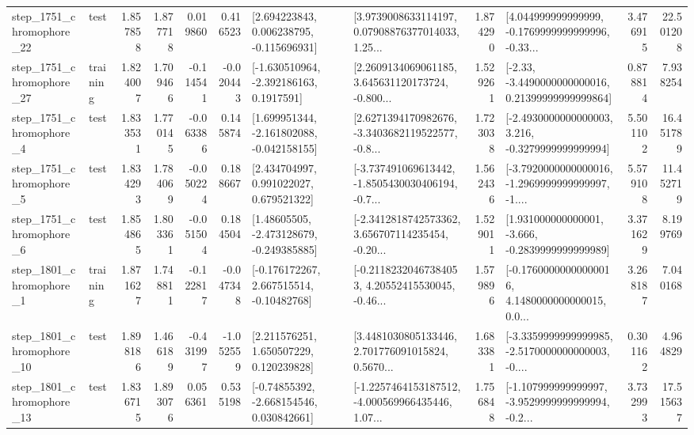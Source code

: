 \begin{tabular}{llrrrrllrlrr}
 step\_1751\_chromophore\_22 &      test &      1.857858 &    1.877718 &      0.019860 &  0.416523 &    [2.694223843, 0.006238795, -0.115696931] &  [3.9739008633114197, 0.07908876377014033, 1.25... &       1.874290 &  [4.044999999999999, -0.1769999999999996, -0.33... &            3.476915 &         22.501208 \\
 step\_1751\_chromophore\_27 &  training &      1.824007 &    1.709466 &     -0.114541 & -0.020443 &     [-1.630510964, -2.392186163, 0.1917591] &  [2.2609134069061185, 3.645631120173724, -0.800... &       1.529261 &  [-2.33, -3.4490000000000016, 0.21399999999999864] &            0.878814 &          7.938254 \\
  step\_1751\_chromophore\_4 &      test &      1.833531 &    1.770145 &     -0.063386 &  0.145874 &   [1.699951344, -2.161802088, -0.042158155] &  [2.6271394170982676, -3.3403682119522577, -0.8... &       1.723038 &  [-2.4930000000000003, 3.216, -0.3279999999999994] &            5.501102 &         16.451789 \\
  step\_1751\_chromophore\_5 &      test &      1.834293 &    1.784069 &     -0.050224 &  0.188667 &     [2.434704997, 0.991022027, 0.679521322] &  [-3.737491069613442, -1.8505430030406194, -0.7... &       1.562436 &  [-3.7920000000000016, -1.2969999999999997, -1.... &            5.579108 &         11.452719 \\
  step\_1751\_chromophore\_6 &      test &      1.854865 &    1.803361 &     -0.051504 &  0.184504 &    [1.48605505, -2.473128679, -0.249385885] &  [-2.3412818742573362, 3.656707114235454, -0.20... &       1.529011 &   [1.931000000000001, -3.666, -0.2839999999999989] &            3.371629 &          8.199769 \\
  step\_1801\_chromophore\_1 &  training &      1.871627 &    1.748811 &     -0.122817 & -0.047348 &    [-0.176172267, 2.667515514, -0.10482768] &  [-0.21182320467384053, 4.20552415530045, -0.46... &       1.579896 &  [-0.17600000000000016, 4.1480000000000015, 0.0... &            3.268187 &          7.040168 \\
 step\_1801\_chromophore\_10 &      test &      1.898186 &    1.466189 &     -0.431997 & -1.052559 &     [2.211576251, 1.650507229, 0.120239828] &  [3.4481030805133446, 2.701776091015824, 0.5670... &       1.683381 &  [-3.3359999999999985, -2.5170000000000003, -0.... &            0.301162 &          4.964829 \\
 step\_1801\_chromophore\_13 &      test &      1.836715 &    1.893076 &      0.056361 &  0.535198 &    [-0.74855392, -2.668154546, 0.030842661] &  [-1.2257464153187512, -4.000569966435446, 1.07... &       1.756848 &  [-1.107999999999997, -3.9529999999999994, -0.2... &            3.732993 &         17.515637 \\

\end{tabular}
